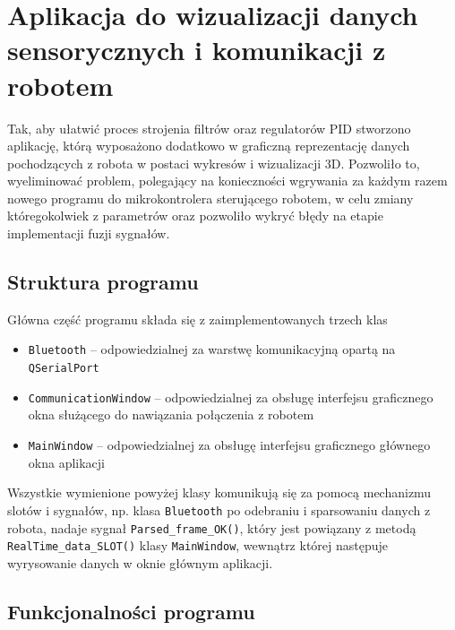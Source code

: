 \chapter{Aplikacja do wizualizacji danych sensorycznych i komunikacji z robotem}

Tak, aby ułatwić proces strojenia filtrów oraz regulatorów PID stworzono aplikację, którą wyposażono dodatkowo w graficzną reprezentację danych pochodzących z robota w postaci wykresów i wizualizacji 3D. Pozwoliło to, wyeliminować problem, polegający na konieczności wgrywania za każdym razem nowego programu do mikrokontrolera sterującego robotem, w celu zmiany któregokolwiek z parametrów oraz pozwoliło wykryć błędy na etapie implementacji fuzji sygnałów.

\section{Struktura programu}

Główna część programu składa się z zaimplementowanych trzech klas
\begin{itemize}
    \item \texttt{Bluetooth} -- odpowiedzialnej za warstwę komunikacyjną opartą na \texttt{QSerialPort}
    \item \texttt{CommunicationWindow} -- odpowiedzialnej za obsługę interfejsu graficznego okna służącego do nawiązania połączenia z robotem
    \item \texttt{MainWindow} -- odpowiedzialnej za obsługę interfejsu graficznego głównego okna aplikacji
\end{itemize}

Wszystkie wymienione powyżej klasy komunikują się za pomocą mechanizmu slotów i sygnałów, np. klasa \texttt{Bluetooth} po odebraniu i sparsowaniu danych z robota, nadaje sygnał \texttt{Parsed\_frame\_OK()}, który jest powiązany z metodą \texttt{RealTime\_data\_SLOT()} klasy \texttt{MainWindow}, wewnątrz której następuje wyrysowanie danych w oknie głównym aplikacji. 
\section{Funkcjonalności programu}

